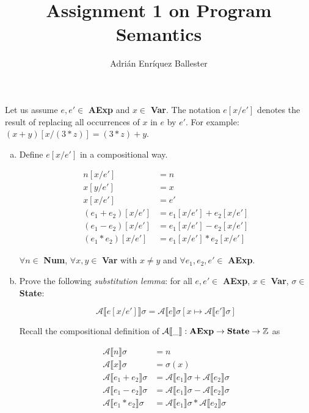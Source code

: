 \documentclass{article}
\title{Assignment 1 on Program Semantics}
\author{Adrián Enríquez Ballester}
\begin{document}
\maketitle

Let us assume $e, e' \in$ \textbf{AExp} and $x \in$ \textbf{Var}. The
notation $e[x/e']$ denotes the result of replacing all occurrences of $x$
in $e$ by $e'$. For example: $(x + y)[x/(3 * z)] = (3 * z) + y$.

\begin{enumerate}[(a)]
  \item Define $e[x/e']$ in a compositional way.

    \begin{align*}
      n[x/e'] &= n \\
      x[y/e'] &= x \\
      x[x/e'] &= e' \\
      (e_1 + e_2)[x/e'] &= e_1[x/e'] + e_2[x/e'] \\
      (e_1 - e_2)[x/e'] &= e_1[x/e'] - e_2[x/e'] \\
      (e_1 * e_2)[x/e'] &= e_1[x/e'] * e_2[x/e'] 
    \end{align*}

    $\forall n \in$ \textbf{Num}, $\forall x, y \in$ \textbf{Var} with 
    $x \neq y$ and $\forall e_1, e_2, e' \in$ \textbf{AExp}.

  \item Prove the following \textit{substitution lemma}: for all $e, e' \in$
    \textbf{AExp}, $x \in$ \textbf{Var}, $\sigma \in$ \textbf{State}:

    $$
      \mathcal{A}\llbracket e[x/e']\rrbracket \sigma = 
        \mathcal{A}\llbracket e\rrbracket \sigma 
          [x \mapsto \mathcal{A}\llbracket e'\rrbracket\sigma]
    $$
 
    Recall the compositional definition of $\mathcal{A}\llbracket \_ 
    \rrbracket : \text{\textbf{AExp}} \rightarrow \text{\textbf{State}} 
    \rightarrow \mathbb{Z}$ as

    \begin{align*}
      \mathcal{A}\llbracket n \rrbracket \sigma &= n \\
      \mathcal{A}\llbracket x \rrbracket \sigma &= \sigma(x) \\
      \mathcal{A}\llbracket e_1 + e_2 \rrbracket \sigma &= 
        \mathcal{A}\llbracket e_1 \rrbracket \sigma + 
        \mathcal{A}\llbracket e_2 \rrbracket \sigma \\
      \mathcal{A}\llbracket e_1 - e_2 \rrbracket \sigma &= 
        \mathcal{A}\llbracket e_1 \rrbracket \sigma - 
        \mathcal{A}\llbracket e_2 \rrbracket \sigma \\
      \mathcal{A}\llbracket e_1 * e_2 \rrbracket \sigma &= 
        \mathcal{A}\llbracket e_1 \rrbracket \sigma * 
        \mathcal{A}\llbracket e_2 \rrbracket \sigma 
    \end{align*}
    

\end{enumerate}
\end{document}
